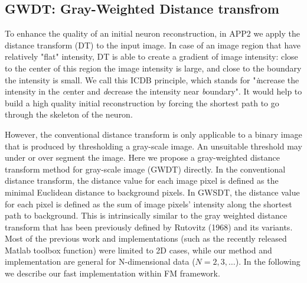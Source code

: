 \subsection{GWDT: Gray-Weighted Distance transfrom} \label{sec:gwdt}
To enhance the quality of an initial neuron reconstruction, in APP2 we apply the distance transform (DT) to the input image. In case of an image region that have relatively "flat" intensity, DT is able to create a gradient of image intensity: close to the center of this region the image intensity is large, and close to the boundary the intensity is small. We call this ICDB principle, which stands for "\emph{i}ncrease the intensity in the \emph{c}enter and \emph{d}ecrease the intensity near \emph{b}oundary". It would help to build a high quality initial reconstruction by forcing the shortest path to go through the skeleton of the neuron.

However, the conventional distance transform is only applicable to a binary image that is produced by thresholding a gray-scale image. An unsuitable threshold may under or over segment the image. Here we propose a gray-weighted distance transform method for gray-scale image (GWDT) directly. In the conventional distance transform, the distance value for each image pixel is defined as the minimal Euclidean distance to background pixels. In GWSDT, the distance value for each pixel is defined as the sum of image pixels’ intensity along the shortest path to background. This is intrinsically similar to the gray weighted distance transform that has been previously defined by Rutovitz (1968)\cite{rutovitz1968data} and its variants. Most of the previous work and implementations (such as the recently released Matlab toolbox function) were limited to 2D cases, while our method and implementation are general for N-dimensional data ($N = 2,3,\ldots$). In the following we describe our fast implementation within FM framework.   

